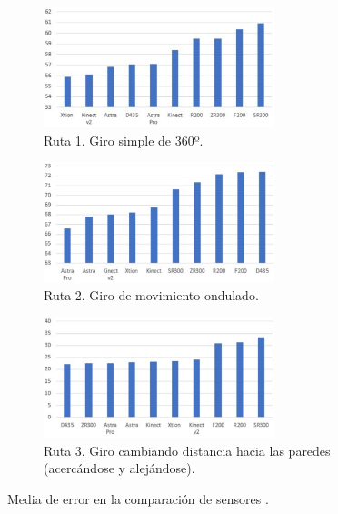 \begin{figure}[h]
    \centering
    \begin{subfigure}[b]{0.35\textheight}
    	\centering
        \includegraphics[height=3.5cm]{archivos/comparacion-sensores-recorrido1.png}
        \caption{Ruta 1. Giro simple de 360º.}
        \label{fig:comparacion-ruta1}
    \end{subfigure}
    \begin{subfigure}[b]{0.35\textheight}
    	\centering
        \includegraphics[height=3.5cm]{archivos/comparacion-sensores-recorrido2.png}
        \caption{Ruta 2. Giro de movimiento ondulado.}
        \label{fig:comparacion-ruta2}
    \end{subfigure}
    \begin{subfigure}[b]{0.35\textheight}
    	\centering
        \includegraphics[height=3.5cm]{archivos/comparacion-sensores-recorrido3.png}
        \caption{Ruta 3. Giro cambiando distancia hacia las paredes (acercándose y alejándose).}
        \label{fig:comparacion-ruta3}
    \end{subfigure}
    \caption{Media de error en la comparación de sensores .}
    \label{fig:comparacion-sensores-media-error}
\end{figure}


